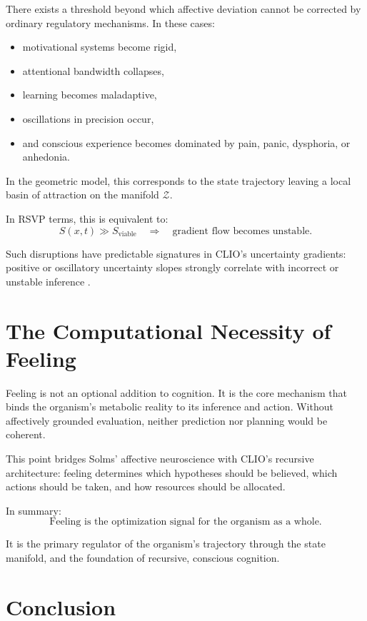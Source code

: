 \documentclass[12pt,oneside]{book}
\theoremstyle{plain}
\theoremstyle{definition}
\let\citep\parencite
\begin{document}
There exists a threshold beyond which affective deviation cannot be corrected
by ordinary regulatory mechanisms.
In these cases:

\begin{itemize}
    \item motivational systems become rigid,
    \item attentional bandwidth collapses,
    \item learning becomes maladaptive,
    \item oscillations in precision occur,
    \item and conscious experience becomes dominated by pain, panic,
          dysphoria, or anhedonia.
\end{itemize}

In the geometric model, this corresponds to the state trajectory leaving a
local basin of attraction on the manifold $\mathcal{Z}$.

In RSVP terms, this is equivalent to:
\[
S(x,t) \gg S_{\text{viable}}
\quad\Rightarrow\quad
\text{gradient flow becomes unstable}.
\]

Such disruptions have predictable signatures in CLIO’s uncertainty
gradients:
positive or oscillatory uncertainty slopes strongly correlate with incorrect
or unstable inference \citep{cheng2025cognitive}.

\section{The Computational Necessity of Feeling}

Feeling is not an optional addition to cognition.
It is the core mechanism that binds the organism’s metabolic reality to its
inference and action.
Without affectively grounded evaluation, neither prediction nor planning
would be coherent.

This point bridges Solms’ affective neuroscience with CLIO’s recursive
architecture:
feeling determines which hypotheses should be believed,
which actions should be taken,
and how resources should be allocated.

In summary:
\[
\boxed{\text{Feeling is the optimization signal for the organism as a whole.}}
\]

It is the primary regulator of the organism’s trajectory through the state
manifold, and the foundation of recursive, conscious cognition.

\section{Conclusion}
\end{document}
